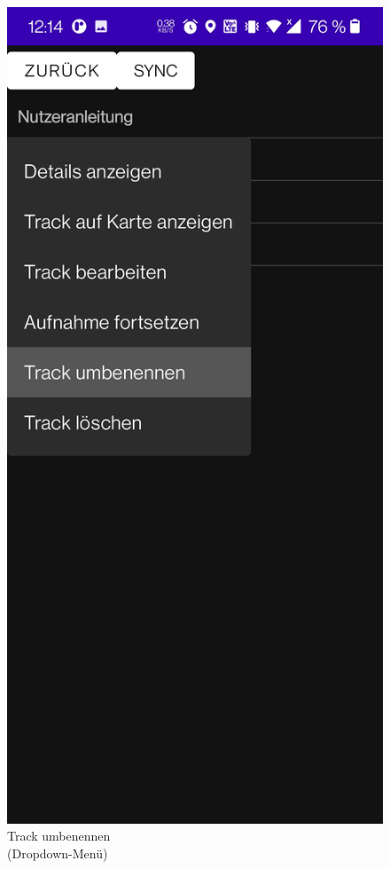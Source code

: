 \documentclass{article}
\begin{document}
	\begin{figure}[H]
		\captionsetup{justification=centering}
		  \includegraphics[scale=0.15]{11_umbenennen.jpg}
		  \centering
		  \caption{Track umbenennen \\	(Dropdown-Menü)}

\end{figure}
\end{document}
